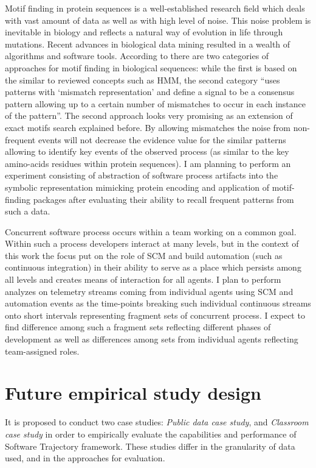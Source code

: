 \documentclass{sig-alternate}
\begin{document}
Motif finding in protein sequences is a well-established research field which deals with vast amount of data as well as with high level of noise. This noise problem is inevitable in biology and reflects a natural way of evolution in life through mutations. Recent advances in biological data mining resulted in a wealth of algorithms and software tools.  According to \cite{citeulike:964046} there are two categories of approaches for motif finding in biological sequences: while the first is based on the similar to reviewed concepts such as HMM, the second category ``uses patterns with `mismatch representation' and define a signal to be a consensus pattern allowing up to a certain number of mismatches to occur in each instance of the pattern''. The second approach looks very promising as an extension of exact motifs search explained before. By allowing mismatches the noise from non-frequent events will not decrease the evidence value for the similar patterns allowing to identify key events of the observed process (as similar to the key amino-acids residues within protein sequences). I am planning to perform an experiment consisting of abstraction of software process artifacts into the symbolic representation mimicking protein encoding and application of motif-finding packages after evaluating their ability to recall frequent patterns from such a data.

Concurrent software process occurs within a team working on a common goal. Within such a process developers interact at many levels, but in the context of this work the focus put on the role of SCM and build automation (such as continuous integration) in their ability to serve as a place which persists among all levels and creates means of interaction for all agents. I plan to perform analyzes on telemetry streams coming from individual agents using SCM and automation events as the time-points breaking such individual continuous streams onto short intervals representing fragment sets of concurrent process. I expect to find difference among such a fragment sets reflecting different phases of development as well as differences among sets from individual agents reflecting team-assigned roles.

\section{Future empirical study design}
It is proposed to conduct two case studies: \textit{Public data case study}, and \textit{Classroom case study} in order to empirically evaluate the capabilities and performance of Software Trajectory framework. These studies differ in the granularity of data used, and in the approaches for evaluation. 
\end{document}
